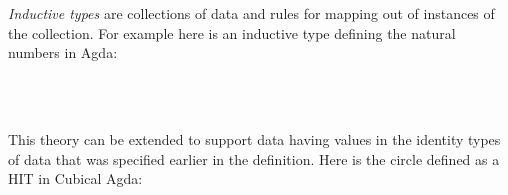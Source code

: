 \documentclass[12pt]{report}
\begin{document}
\emph{Inductive types} are collections of data and rules for mapping out of instances of the collection. For example here is an inductive type defining the natural numbers in Agda:
\begin{code}%
	\>[0]\AgdaSpace{}%
	\AgdaSpace{}%
	\AgdaSymbol{:}\AgdaSpace{}%
	\AgdaSpace{}%
	\<%
	\\
	\>[0][@{}l@{\AgdaIndent{0}}]%
	\>[2]\AgdaSpace{}%
	\AgdaSymbol{:}\AgdaSpace{}%
	\<%
	\\
	\>[2]\AgdaSpace{}%
	\AgdaSymbol{:}\AgdaSpace{}%
	\AgdaSpace{}%
	\AgdaSymbol{$\to$}\AgdaSpace{}%
	\<%
\end{code}

This theory can be extended to support data having values in the identity types of data that was specified earlier in the definition. Here is the circle defined as a HIT in Cubical Agda:
\begin{code}%
	\>[0]\AgdaSpace{}%
	\AgdaSpace{}%
	\AgdaSymbol{:}\AgdaSpace{}%
	\AgdaSpace{}%
	\<%
	\\
	\>[0][@{}l@{\AgdaIndent{0}}]%
	\>[2]\AgdaSpace{}%
	\AgdaSymbol{:}\AgdaSpace{}%
	\<%
	\\
	\>[2]\AgdaSpace{}%
	\AgdaSymbol{:}\AgdaSpace{}%
	\AgdaSpace{}%
	\AgdaOperator{\AgdaFunction{$\equiv$}}\AgdaSpace{}%
	\<%
\end{code}
\end{document}
